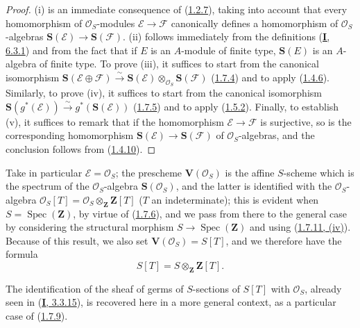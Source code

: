 \begin{proof}
(i) is an immediate consequence of
(\hyperref[II.1.2.7]{1.2.7}), taking into account that every
homomorphism of $\mathcal{O}_S$-modules $\mathcal{E}\to\mathcal{F}$
canonically defines a homomorphism of $\mathcal{O}_S$-algebras
$\mathbf{S}(\mathcal{E})\to\mathbf{S}(\mathcal{F})$. (ii) follows
immediately from the definitions (\hyperref[I.6.3.1]{\textbf{I}, 6.3.1}) and
from the fact that if $E$ is an $A$-module of finite type, $\mathbf{S}(E)$
is an $A$-algebra of finite type. To prove (iii), it suffices to start
from the canonical isomorphism
$\mathbf{S}(\mathcal{E}\oplus\mathcal{F})
\xrightarrow{\sim}\mathbf{S}(\mathcal{E})
\otimes_{\mathcal{O}_S}\mathbf{S}(\mathcal{F})$
(\hyperref[II.1.7.4]{1.7.4}) and to apply
(\hyperref[II.1.4.6]{1.4.6}). Similarly, to prove (iv), it suffices to
start from the canonical isomorphism
$\mathbf{S}(g^*(\mathcal{E}))
\xrightarrow{\sim} g^*(\mathbf{S}(\mathcal{E}))$
(\hyperref[II.1.7.5]{1.7.5}) and to apply
(\hyperref[II.1.5.2]{1.5.2}). Finally, to establish (v), it suffices to
remark that if the homomorphism $\mathcal{E}\to\mathcal{F}$ is surjective,
so is the corresponding homomorphism
$\mathbf{S}(\mathcal{E})\to\mathbf{S}(\mathcal{F})$ of
$\mathcal{O}_S$-algebras, and the conclusion follows from
(\hyperref[II.1.4.10]{1.4.10}).
\end{proof}

\begin{env}[1.7.12]
\label{II.1.7.12}
Take in particular $\mathcal{E}=\mathcal{O}_S$; the prescheme
$\mathbf{V}(\mathcal{O}_S)$ is the affine $S$-scheme which is the spectrum
of the $\mathcal{O}_S$-algebra $\mathbf{S}(\mathcal{O}_S)$, and the latter
is identified with the $\mathcal{O}_S$-algebra
$\mathcal{O}_S[T]=\mathcal{O}_S\otimes_{\mathbf{Z}}\mathbf{Z}[T]$
($T$ an indeterminate); this is evident when
$S=\operatorname{Spec}(\mathbf{Z})$, by virtue of
(\hyperref[II.1.7.6]{1.7.6}), and we pass from there to the general case
by considering the structural morphism
$S\to\operatorname{Spec}(\mathbf{Z})$ and using
(\hyperref[II.1.7.11]{1.7.11, (iv)}). Because of this result, we also
set $\mathbf{V}(\mathcal{O}_S)=S[T]$, and we therefore have the formula
\[
  S[T]=S\otimes_{\mathbf{Z}}\mathbf{Z}[T].
  \tag{1.7.12.1}\label{II.1.7.12.1}
\]

The identification of the sheaf of germs of $S$-sections of $S[T]$ with
$\mathcal{O}_S$, already seen in
(\hyperref[I.3.3.15]{\textbf{I}, 3.3.15}), is recovered here in a more
general context, as a particular case of (\hyperref[II.1.7.9]{1.7.9}).
\end{env}

